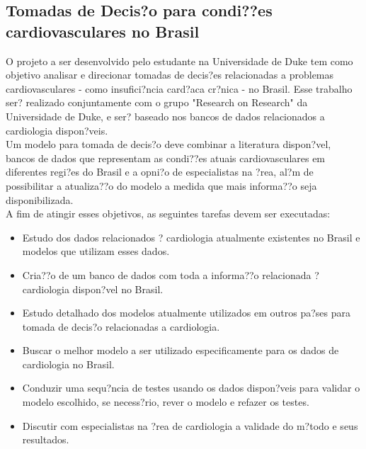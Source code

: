\documentclass{article}
\begin{document}
\subsection{ \label{subsec:cardiovascular} Tomadas de Decis?o para condi??es cardiovasculares no Brasil}
O projeto a ser desenvolvido pelo estudante na Universidade de Duke tem como objetivo analisar e direcionar tomadas de decis?es relacionadas a problemas cardiovasculares - como insufici?ncia card?aca cr?nica -  no Brasil. Esse trabalho ser? realizado conjuntamente com o grupo "Research on Research" da Universidade de Duke, e ser? baseado nos bancos de dados relacionados a cardiologia dispon?veis.\\
Um modelo para tomada de decis?o deve combinar a literatura dispon?vel, bancos de dados que representam as condi??es atuais cardiovasculares em diferentes regi?es do Brasil e a opni?o de especialistas na ?rea, al?m de possibilitar a atualiza??o do modelo a medida que mais informa??o seja disponibilizada.\\
A fim de atingir esses objetivos, as seguintes tarefas devem ser executadas:
\begin{itemize}
	\item Estudo dos dados relacionados ? cardiologia atualmente existentes no Brasil e modelos que utilizam esses dados.
	\item Cria??o de um banco de dados com toda a informa??o relacionada ? cardiologia dispon?vel no Brasil.
	
	
	\item Estudo detalhado dos modelos atualmente utilizados em outros pa?ses para tomada de decis?o relacionadas a cardiologia.
	\item Buscar o melhor modelo a ser utilizado especificamente para os dados de cardiologia no Brasil.
	\item Conduzir uma sequ?ncia de testes usando os dados dispon?veis para validar o modelo escolhido, se necess?rio, rever o modelo e refazer os testes.
	\item Discutir com especialistas na ?rea de cardiologia a validade do m?todo e seus resultados.
	
	
\end{itemize}
\end{document}
